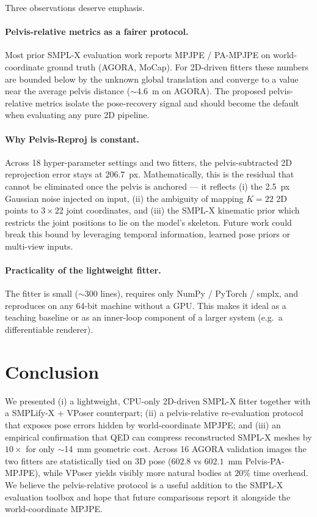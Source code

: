 \documentclass[conference]{IEEEtran}
\begin{document}
Three observations deserve emphasis.

\paragraph{Pelvis-relative metrics as a fairer protocol.}
Most prior SMPL-X evaluation work reports MPJPE / PA-MPJPE on world-coordinate ground truth (AGORA, MoCap). For 2D-driven fitters these numbers are bounded below by the unknown global translation and converge to a value near the average pelvis distance ($\sim$4.6~m on AGORA). The proposed pelvis-relative metrics isolate the pose-recovery signal and should become the default when evaluating any pure 2D pipeline.

\paragraph{Why Pelvis-Reproj is constant.}
Across 18 hyper-parameter settings and two fitters, the pelvis-subtracted 2D reprojection error stays at $206.7$~px. Mathematically, this is the residual that cannot be eliminated once the pelvis is anchored --- it reflects (i) the 2.5~px Gaussian noise injected on input, (ii) the ambiguity of mapping $K=22$ 2D points to $3\times 22$ joint coordinates, and (iii) the SMPL-X kinematic prior which restricts the joint positions to lie on the model's skeleton. Future work could break this bound by leveraging temporal information, learned pose priors or multi-view inputs.

\paragraph{Practicality of the lightweight fitter.}
The fitter is small ($\sim$300 lines), requires only NumPy / PyTorch / smplx, and reproduces on any 64-bit machine without a GPU. This makes it ideal as a teaching baseline or as an inner-loop component of a larger system (e.g.\ a differentiable renderer).

\section{Conclusion}
\label{sec:conclusion}

We presented (i) a lightweight, CPU-only 2D-driven SMPL-X fitter together with a SMPLify-X + VPoser counterpart; (ii) a pelvis-relative re-evaluation protocol that exposes pose errors hidden by world-coordinate MPJPE; and (iii) an empirical confirmation that QED can compress reconstructed SMPL-X meshes by $10\times$ for only $\sim$14~mm geometric cost. Across 16 AGORA validation images the two fitters are statistically tied on 3D pose ($602.8$ vs $602.1$~mm Pelvis-PA-MPJPE), while VPoser yields visibly more natural bodies at $20\%$ time overhead. We believe the pelvis-relative protocol is a useful addition to the SMPL-X evaluation toolbox and hope that future comparisons report it alongside the world-coordinate MPJPE.
\end{document}
